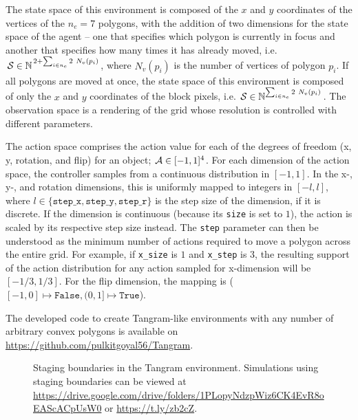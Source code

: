 The state space of this environment is composed of the \(x\) and \(y\) coordinates of the vertices of the \(n_e = 7\) polygons, with the addition of two dimensions for the state space of the agent -- one that specifies which polygon is currently in focus and another that specifies how many times it has already moved, i.e. \(\cS \in \nN^{\,2 + \sum_{i \in n_e} 2\ N_v(p_i)}\), where \(N_v(p_i)\) is the number of vertices of polygon \(p_i\).
If all polygons are moved at once, the state space of this environment is composed of only the \(x\) and \(y\) coordinates of the block pixels, i.e. \(\mathcal{S} \in \mathbb{N}^{\sum_{i \in n_e} 2\ N_v(p_i)}\).
The observation space is a rendering of the grid whose resolution is controlled with different parameters.

The action space comprises the action value for each of the degrees of freedom (x, y, rotation, and flip) for an object; \(\mathcal{A} \in [-1, 1]^4\).
For each dimension of the action space, the controller samples from a continuous distribution in \([-1, 1]\).
In the x-, y-, and rotation dimensions, this is uniformly mapped to integers in \([-l, l]\), where \(l \in \{\texttt{step\_x}, \texttt{step\_y}, \texttt{step\_r}\}\) is the step size of the dimension, if it is discrete.
If the dimension is continuous (because its \texttt{size} is set to \(1\)), the action is scaled by its respective step size instead.
The \texttt{step} parameter can then be understood as the minimum number of actions required to move a polygon across the entire grid.
For example, if \texttt{x\_size} is \(1\) and \texttt{x\_step} is \(3\), the resulting support of the action distribution for any action sampled for x-dimension will be \([-1/3, 1/3]\).
For the flip dimension, the mapping is (\([-1, 0] \mapsto \texttt{False}, (0, 1] \mapsto \texttt{True}\)).

The developed code to create Tangram-like environments with any number of arbitrary convex polygons is available on \url{https://github.com/pulkitgoyal56/Tangram}.

\vspace{6pt}
\begin{figure}[h]
    \centering
    \caption[Staging boundaries in the Tangram environment.]{Staging boundaries in the Tangram environment. Simulations using staging boundaries can be viewed at \url{https://drive.google.com/drive/folders/1PLopyNdzpWiz6CK4EvR8oEAScACpUsW0} or \url{https://t.ly/zb2cZ}.}
    \label{fig:staging-boundaries}
\end{figure}

